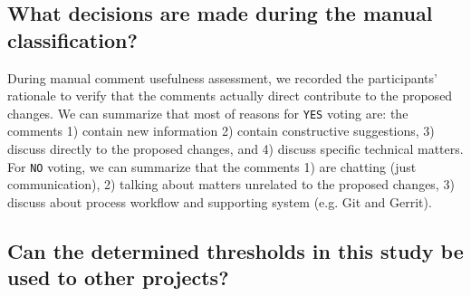 \subsection{What decisions are made during the manual classification?}
During manual comment usefulness assessment, we recorded the participants' rationale to verify that the comments actually direct contribute to the proposed changes. We can summarize that most of reasons for \texttt{YES} voting are: the comments 1) contain new information 2) contain constructive suggestions, 3) discuss directly to the proposed changes, and 4) discuss specific technical matters. For \texttt{NO} voting, we can summarize that the comments 1) are chatting (just communication), 2) talking about matters unrelated to the proposed changes, 3) discuss about process workflow and supporting system (e.g. Git and Gerrit).
%
%
%

\subsection{Can the determined thresholds in this study be used to other projects?}

